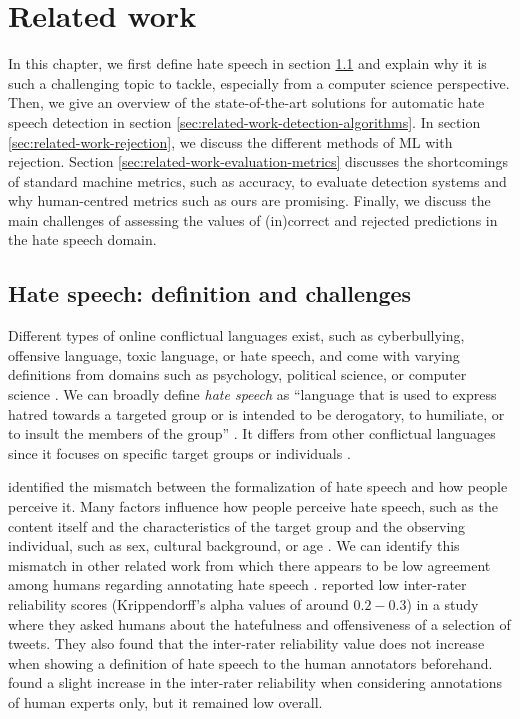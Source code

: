 \chapter{Related work}
\label{ch:related-work}
In this chapter, we first define hate speech in section \ref{sec:related-work-challenges} and explain why it is such a challenging topic to tackle, especially from a computer science perspective.
%
Then, we give an overview of the state-of-the-art solutions for automatic hate speech detection in section \ref{sec:related-work-detection-algorithms}.
%
In section \ref{sec:related-work-rejection}, we discuss the different methods of ML with rejection.
%
Section \ref{sec:related-work-evaluation-metrics} discusses the shortcomings of standard machine metrics, such as accuracy, to evaluate detection systems and why human-centred metrics such as ours are promising.
%
Finally, we discuss the main challenges of assessing the values of (in)correct and rejected predictions in the hate speech domain.
%

\section{Hate speech: definition and challenges}
\label{sec:related-work-challenges}
Different types of online conflictual languages exist, such as cyberbullying, offensive language, toxic language, or hate speech, and come with varying definitions from domains such as psychology, political science, or computer science \citep{balayn2021automatic}.
%
We can broadly define \textit{hate speech} as ``language that is used to express hatred towards a targeted group or is intended to be derogatory, to humiliate, or to insult the members of the group'' \citep{davidson2017automated, balayn2021automatic}.
%
It differs from other conflictual languages since it focuses on specific target groups or individuals \citep{balayn2021automatic}.
%
%

%
\citet{balayn2021automatic} identified the mismatch between the formalization of hate speech and how people perceive it.
%
Many factors influence how people perceive hate speech, such as the content itself and the characteristics of the target group and the observing individual, such as sex, cultural background, or age \citep{balayn2021automatic}.
%
We can identify this mismatch in other related work from which there appears to be low agreement among humans regarding annotating hate speech \citep{fortuna2018survey, ross2017measuring, waseem2016you}.
%
\citet{ross2017measuring} reported low inter-rater reliability scores (Krippendorff's alpha values of around $0.2-0.3$) in a study where they asked humans about the hatefulness and offensiveness of a selection of tweets.
%
They also found that the inter-rater reliability value does not increase when showing a definition of hate speech to the human annotators beforehand.
%
\citet{waseem2016you} found a slight increase in the inter-rater reliability when considering annotations of human experts only, but it remained low overall.
%
%


